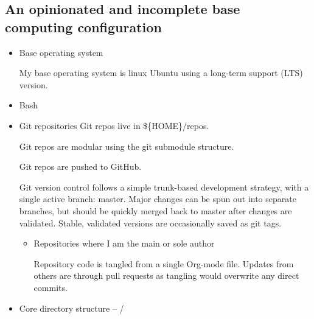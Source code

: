 \documentclass{article}
\begin{document}
\subsection*{An opinionated and incomplete base computing configuration}
\label{sec:orga5f5850}
\begin{itemize}
\item Base operating system
\label{sec:org6765a66}

My base operating system is linux Ubuntu using a long-term support (LTS) version.

\item Bash
\label{sec:org73af506}
\item Git repositories
\label{sec:org73340c5}
Git repos live in \$\{HOME\}/repos.

Git repos are modular using the git submodule structure.

Git repos are pushed to GitHub.

Git version control follows a simple trunk-based development strategy, with a single active branch: master. Major changes can be spun out into separate branches, but should be quickly merged back to master after changes are validated. Stable, validated versions are occasionally saved as git tags.

\begin{itemize}
\item Repositories where I am the main or sole author
\label{sec:org40f62f6}

Repository code is tangled from a single Org-mode file. Updates from others are through pull requests as tangling would overwrite any direct commits.
\end{itemize}

\item Core directory structure
\label{sec:org64969e9}
-- /
\begin{center}
\begin{tabular}{}
\hline
\hline
\hline
\hline
\hline
\hline
\end{tabular}


\end{center}
\end{itemize}
\end{document}
